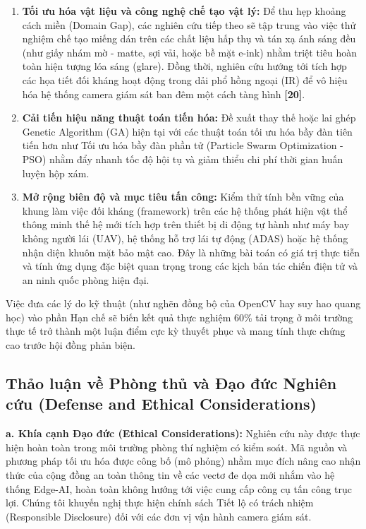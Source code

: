 \documentclass[a4paper,fleqn]{cas-dc}
\begin{document}
\begin{enumerate}
\def\labelenumi{\arabic{enumi}.}
\item
  \textbf{Tối ưu hóa vật liệu và công nghệ chế tạo vật lý:} Để thu hẹp
  khoảng cách miền (Domain Gap), các nghiên cứu tiếp theo sẽ tập trung
  vào việc thử nghiệm chế tạo miếng dán trên các chất liệu hấp thụ và
  tán xạ ánh sáng đều (như giấy nhám mờ - matte, sợi vải, hoặc bề mặt
  e-ink) nhằm triệt tiêu hoàn toàn hiện tượng lóa sáng (glare). Đồng
  thời, nghiên cứu hướng tới tích hợp các họa tiết đối kháng hoạt động
  trong dải phổ hồng ngoại (IR) để vô hiệu hóa hệ thống camera giám sát
  ban đêm một cách tàng hình \textbf{{[}20{]}}.
\item
  \textbf{Cải tiến hiệu năng thuật toán tiến hóa:} Đề xuất thay thế hoặc
  lai ghép Genetic Algorithm (GA) hiện tại với các thuật toán tối ưu hóa
  bầy đàn tiên tiến hơn như Tối ưu hóa bầy đàn phần tử (Particle Swarm
  Optimization - PSO) nhằm đẩy nhanh tốc độ hội tụ và giảm thiểu chi phí
  thời gian huấn luyện hộp xám.
\item
  \textbf{Mở rộng biên độ và mục tiêu tấn công:} Kiểm thử tính bền vững
  của khung làm việc đối kháng (framework) trên các hệ thống phát hiện
  vật thể thông minh thế hệ mới tích hợp trên thiết bị di động tự hành
  như máy bay không người lái (UAV), hệ thống hỗ trợ lái tự động (ADAS)
  hoặc hệ thống nhận diện khuôn mặt bảo mật cao. Đây là những bài toán
  có giá trị thực tiễn và tính ứng dụng đặc biệt quan trọng trong các
  kịch bản tác chiến điện tử và an ninh quốc phòng hiện đại.
\end{enumerate}

Việc đưa các lý do kỹ thuật (như nghẽn đồng bộ của OpenCV hay suy hao
quang học) vào phần Hạn chế sẽ biến kết quả thực nghiệm 60\% tải trọng ở
môi trường thực tế trở thành một luận điểm cực kỳ thuyết phục và mang
tính thực chứng cao trước hội đồng phản biện.

\subsection{Thảo luận về Phòng thủ và Đạo đức Nghiên cứu (Defense and Ethical Considerations)}



\textbf{a. Khía cạnh Đạo đức (Ethical Considerations):} Nghiên cứu này
được thực hiện hoàn toàn trong môi trường phòng thí nghiệm có kiểm soát.
Mã nguồn và phương pháp tối ưu hóa được công bố (mô phỏng) nhằm mục đích
nâng cao nhận thức của cộng đồng an toàn thông tin về các vectơ đe dọa
mới nhắm vào hệ thống Edge-AI, hoàn toàn không hướng tới việc cung cấp
công cụ tấn công trục lợi. Chúng tôi khuyến nghị thực hiện chính sách
Tiết lộ có trách nhiệm (Responsible Disclosure) đối với các đơn vị vận
hành camera giám sát.
\end{document}
